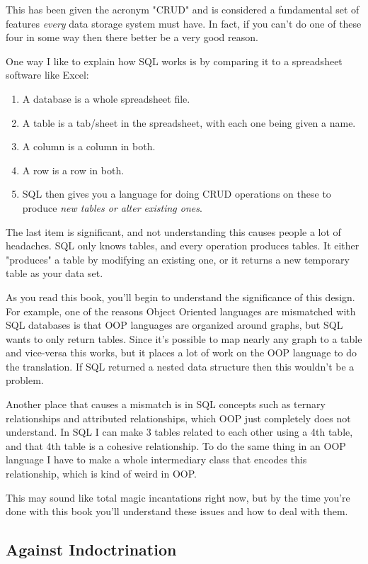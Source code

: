 This has been given the acronym "CRUD" and is considered a fundamental set of
features \emph{every} data storage system must have.  In fact, if you can't do 
one of these four in some way then there better be a very good reason.

One way I like to explain how SQL works is by comparing it to a spreadsheet 
software like Excel:

\begin{enumerate}
\item A database is a whole spreadsheet file.
\item A table is a tab/sheet in the spreadsheet, with each one being given a name.
\item A column is a column in both.
\item A row is a row in both.
\item SQL then gives you a language for doing CRUD operations on these to 
    produce \emph{new tables or alter existing ones}.
\end{enumerate}

The last item is significant, and not understanding this causes people a lot of headaches.
SQL only knows tables, and every operation produces tables.  It either "produces" a table
by modifying an existing one, or it returns a new temporary table as your data set.

As you read this book, you'll begin to understand the significance of this design.  For
example, one of the reasons Object Oriented languages are mismatched with SQL databases
is that OOP languages are organized around graphs, but SQL wants to only return tables.
Since it's possible to map nearly any graph to a table and vice-versa this works, but
it places a lot of work on the OOP language to do the translation.  If SQL returned
a nested data structure then this wouldn't be a problem.

Another place that causes a mismatch is in SQL concepts such as ternary
relationships and attributed relationships, which OOP just completely does not
understand.  In SQL I can make 3 tables related to each other using a 4th
table, and that 4th table is a cohesive relationship.  To do the same thing in
an OOP language I have to make a whole intermediary class that encodes this
relationship, which is kind of weird in OOP.

This may sound like total magic incantations right now, but by the time you're
done with this book you'll understand these issues and how to deal with them.

\subsection*{Against Indoctrination}

